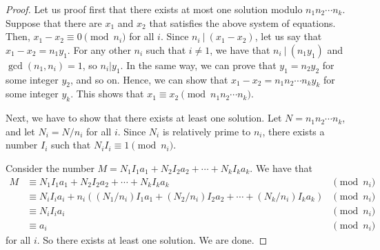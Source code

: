 \documentclass{article}
\begin{document}
\begin{itemize}
\begin{proof}
Let us proof first that there exists at most one solution modulo 
$n_1 n_2 \dotsm n_k$. Suppose that there are $x_1$ and $x_2$ that 
satisfies the above system of equations. Then, $x_1 - x_2 \equiv 0 \pmod{n_i}$ 
for all $i$. Since $n_i\ |\ (x_1-x_2)$, let us say that $x_1 - x_2 = n_1 y_1.$
For any other $n_i$ such that $i \neq 1$, we have that $n_i\ |\ (n_1 y_1)$
and $\gcd(n_1, n_i) = 1$, so $n_i | y_1.$ In the same way, we can
prove that $y_1 = n_2 y_2$ for some integer $y_2$, and so on. Hence,
we can show that $x_1 - x_2 = n_1 n_2 \dotsm n_k y_k$ for some 
integer $y_k$. This shows that $x_1 \equiv x_2 \pmod{n_1 n_2 \dotsm n_k}.$

Next, we have to show that there exists at least one solution. Let $N = n_1 n_2 \dotsm n_k$, and let $N_i = N / n_i$ for all $i$. Since $N_i$ is relatively prime to $n_i$, there exists a number $I_i$ such that $N_i I_i \equiv 1 \pmod{n_i}$.

Consider the number $M = N_1 I_1 a_1 + N_2 I_2 a_2 + \dotsb + N_k I_k a_k$. We have that
\begin{align*}
M &\equiv N_1 I_1 a_1 + N_2 I_2 a_2 + \dotsb + N_k I_k a_k &\pmod{n_i}\\
&\equiv N_i I_i a_i + n_i((N_1/n_i) I_1 a_1 + (N_2/n_i) I_2 a_2 + \dotsb + (N_k/n_i) I_k a_k)  &\pmod{n_i}\\
&\equiv N_i I_i a_i &\pmod{n_i}\\
&\equiv a_i &\pmod{n_i}
\end{align*}
for all $i$. So there exists at least one solution. We are done.
\end{proof}
\end{itemize}
\end{document}
